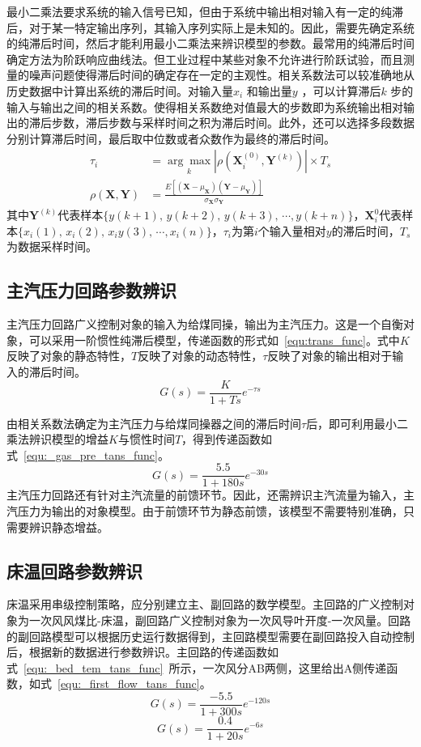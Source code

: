 最小二乘法要求系统的输入信号已知，但由于系统中输出相对输入有一定的纯滞后，对于某一特定输出序列，其输入序列实际上是未知的。因此，需要先确定系统的纯滞后时间，然后才能利用最小二乘法来辨识模型的参数。最常用的纯滞后时间确定方法为阶跃响应曲线法。但工业过程中某些对象不允许进行阶跃试验，而且测量的噪声问题使得滞后时间的确定存在一定的主观性。相关系数法可以较准确地从历史数据中计算出系统的滞后时间。对输入量$x_{i}$ 和输出量$y$ ，可以计算滞后$k$ 步的输入与输出之间的相关系数。使得相关系数绝对值最大的步数即为系统输出相对输出的滞后步数，滞后步数与采样时间之积为滞后时间。此外，还可以选择多段数据分别计算滞后时间，最后取中位数或者众数作为最终的滞后时间。
\begin{align}
\tau_{i} &= \underset{k}{\arg\max}|{\rho(\bm{X}_{i}^{(0)},\bm{Y}^{(k)})}|\times{T_{s}}\\
\rho(\bm{X},\bm{Y})&=\frac{E[(\bm{X}-\mu_{\bm{X}})(\bm{Y}-\mu_{\bm{Y}})]}{\sigma_{\bm{X}}\sigma_{\bm{Y}}}
\end{align}
其中$\bm{Y}^{(k)}$代表样本$\{y(k+1),\,y(k+2),\,y(k+3),\,\cdots,y(k+n)\}$，$\bm{X}_{i}^{0}$代表样本$\{x_{i}(1),\,x_{i}(2),\,x_{i}y(3),\,\cdots,x_{i}(n)\}$，$\tau_{i}$为第$i$个输入量相对$y$的滞后时间，$T_{s}$为数据采样时间。
 
\subsection{主汽压力回路参数辨识}
主汽压力回路广义控制对象的输入为给煤同操，输出为主汽压力。这是一个自衡对象，可以采用一阶惯性纯滞后模型，传递函数的形式如~\ref{equ:trans_func}。式中$K$反映了对象的静态特性，$T$反映了对象的动态特性，$\tau$反映了对象的输出相对于输入的滞后时间。
\begin{equation}
\label{equ:trans_func}
G(s) = \frac{K}{1+Ts}e^{-\tau{s}}
\end{equation}
 
由相关系数法确定为主汽压力与给煤同操器之间的滞后时间$\tau$后，即可利用最小二乘法辨识模型的增益$K$与惯性时间$T$，得到传递函数如式~\ref{equ:_gas_pre_tans_func}。
\begin{equation}
\label{equ:_gas_pre_tans_func}
G(s) = \frac{5.5}{1+180s}e^{-30{s}}
\end{equation}
主汽压力回路还有针对主汽流量的前馈环节。因此，还需辨识主汽流量为输入，主汽压力为输出的对象模型。由于前馈环节为静态前馈，该模型不需要特别准确，只需要辨识静态增益。
\subsection{床温回路参数辨识}
床温采用串级控制策略，应分别建立主、副回路的数学模型。主回路的广义控制对象为一次风风煤比-床温，副回路广义控制对象为一次风导叶开度-一次风量。回路的副回路模型可以根据历史运行数据得到，主回路模型需要在副回路投入自动控制后，根据新的数据进行参数辨识。主回路的传递函数如式~\ref{equ:_bed_tem_tans_func}~所示，一次风分AB两侧，这里给出A侧传递函数，如式~\ref{equ:_first_flow_tans_func}。
\begin{equation}
\label{equ:_bed_tem_tans_func}
G(s) = \frac{-5.5}{1+300s}e^{-120{s}} 
\end{equation}
\begin{equation}
\label{equ:_first_flow_tans_func}
G(s) = \frac{0.4}{1+20s}e^{-6{s}}
\end{equation}

